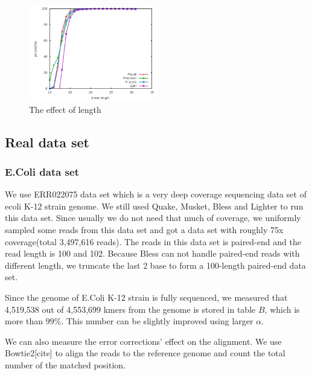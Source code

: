 \documentclass[10pt]{article}
\begin{document}
\begin{figure}[h!]
\begin{center}
\includegraphics[width=0.5\textwidth]{kmerLength.jpg}
\caption{The effect of \kmer length\label{fig:kmerLength}}
\end{center}
\end{figure}


\subsection*{Real data set}
\subsubsection*{E.Coli data set}
We use ERR022075 data set which is a very deep coverage sequencing data set of ecoli K-12 strain genome. We still used Quake, Musket, Bless and Lighter to run this data set. Since usually we do not need that much of coverage, we uniformly sampled some reads from this data set and got a data set with roughly 75x coverage(total 3,497,616 reads). The reads in this data set is paired-end and the read length is 100 and 102. Because Bless can not handle paired-end reads with different length, we truncate the last 2 base to form a 100-length paired-end data set.

Since the genome of E.Coli K-12 strain is fully sequenced, we measured that 4,519,538 out of 4,553,699 kmers from the genome is stored in table $B$, which is more than $99\%$. This number can be slightly improved using larger $\alpha$. 
 
We can also measure the error corrections' effect on the alignment. We use Bowtie2[cite] to align the reads to the reference genome and count the total number of the matched position.
\end{document}
